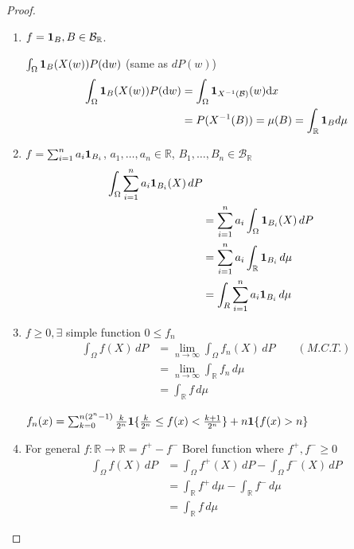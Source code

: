 \documentclass[11pt]{article}
\begin{document}
\begin{proof}
    \begin{enumerate}
        \item $f = \bm{1}_{B}, B \in \mathcal{B}_{\mathbb{R}}$.
        \begin{remark}
            $\int_{\Omega} \bm{1}_{B}(X(w))  P(\mathrm{d}w)$ (same as $dP(w)$)
            \begin{align*}
                \int_{\Omega} \bm{1}_{B}(X(w))  P(\mathrm{d}w) &= \int_{\Omega}\bm{1}_{X^{-1}(\mathcal{B})}(w)\mathrm{d}x\\
                &= P(X^{-1}(B)) = \mu(B) = \int_{\mathbb{R}} \bm{1}_{B} d \mu
            \end{align*}
        \end{remark}
        \item $f = \sum_{i=1}^{n} a_{i} \bm{1}_{B_{i}}$, $a_1, \ldots ,a_n \in \mathbb{R}$, $B_1, \ldots ,B_n \in \mathcal{B}_{\mathbb{R}}$
        \begin{align*}
            \int_{\Omega} \sum_{i=1}^{n}a_{i}\bm{1}_{B_i}(X) \, dP \\
            &= \sum_{i=1}^{n}a_{i}  \int_{\Omega} \bm{1}_{B_i}(X) \, dP\\
            &= \sum_{i=1}^{n}a_i \int_{\mathbb{R}} \bm{1}_{B_i}\, d \mu \\
            &= \int_{R} \sum_{i=1}^{n}a_i \bm{1}_{B_i} \, d \mu
        \end{align*}
        \item $f \ge 0, \exists $ simple function $0 \le f_n $
        \begin{align*}
            \int _{\Omega} f(X) \, dP &= \lim_{n \to \infty} \int_{\Omega} f_n(X) \, dP \qquad (M.C.T.)\\
            &= \lim_{n \to \infty} \int_{\mathbb{R}} f_n \, d \mu \\
            &= \int_{\mathbb{R}} f \, d \mu
        \end{align*}
        \begin{remark}
            $f_n(x) = \sum_{k=0}^{n(2^n - 1)} \frac{k}{2^n} \bm{1} \{\frac{k}{2^n} \le f(x) < \frac{k+1}{2^n}\}
            + n \bm{1} \{ f(x) > n\}$
        \end{remark}
        \item For general $f: \mathbb{R} \to \mathbb{R} = f^{+} - f^{-}$ Borel function where $f^{+}, f^{-} \ge 0$
        \begin{align*}
            \int _{\Omega} f(X) \, dP &= \int _{\Omega} f^{+}(X) \, dP - \int _{\Omega} f^{-}(X) \, dP\\
            &= \int _{\mathbb{R}} f^{+} \, d \mu - \int _{\mathbb{R}} f^{-} \, d \mu \\
            &= \int_{\mathbb{R}} f \, d \mu
        \end{align*}
    \end{enumerate}
\end{proof}
\end{document}
